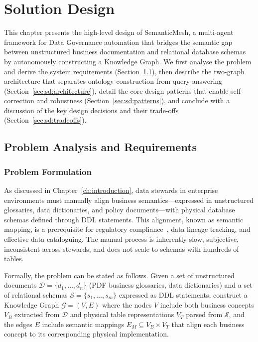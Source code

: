 \chapter{Solution Design}
\label{ch:solution_design}

This chapter presents the high-level design of SemanticMesh, a multi-agent framework for Data Governance automation that bridges the semantic gap between unstructured business documentation and relational database schemas by autonomously constructing a Knowledge Graph. We first analyse the problem and derive the system requirements (Section~\ref{sec:sd:requirements}), then describe the two-graph architecture that separates ontology construction from query answering (Section~\ref{sec:sd:architecture}), detail the core design patterns that enable self-correction and robustness (Section~\ref{sec:sd:patterns}), and conclude with a discussion of the key design decisions and their trade-offs (Section~\ref{sec:sd:tradeoffs}).

\section{Problem Analysis and Requirements}
\label{sec:sd:requirements}

\subsection{Problem Formulation}
\label{sec:sd:problem}

As discussed in Chapter~\ref{ch:introduction}, data stewards in enterprise environments must manually align business semantics---expressed in unstructured glossaries, data dictionaries, and policy documents---with physical database schemas defined through DDL statements. This alignment, known as semantic mapping, is a prerequisite for regulatory compliance~\cite{eu2016generaldataprotectionregulation}, data lineage tracking, and effective data cataloguing. The manual process is inherently slow, subjective, inconsistent across stewards, and does not scale to schemas with hundreds of tables.

Formally, the problem can be stated as follows. Given a set of unstructured documents $\mathcal{D} = \{d_1, \ldots, d_n\}$ (PDF business glossaries, data dictionaries) and a set of relational schemas $\mathcal{S} = \{s_1, \ldots, s_m\}$ expressed as DDL statements, construct a Knowledge Graph $\mathcal{G} = (V, E)$ where the nodes $V$ include both business concepts $V_B$ extracted from $\mathcal{D}$ and physical table representations $V_T$ parsed from $\mathcal{S}$, and the edges $E$ include semantic mappings $E_M \subseteq V_B \times V_T$ that align each business concept to its corresponding physical implementation.

